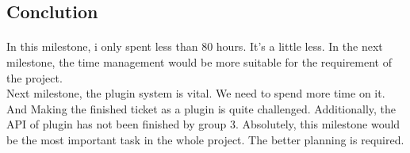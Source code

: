 \documentclass[10pt,a4,oneside]{article}
\begin{document}
\subsection*{Conclution}

\paragraph{}
In this milestone, i only spent less than 80 hours. It's a little less. In the next milestone, the time management would be more suitable for the requirement of the project.\\

Next milestone, the plugin system is vital. We need to spend more time on it. And Making the finished ticket as a plugin is quite challenged. Additionally, the API of plugin has not been finished by group 3. Absolutely, this milestone would be the most important task in the whole project. The better planning is required.
\end{document}
